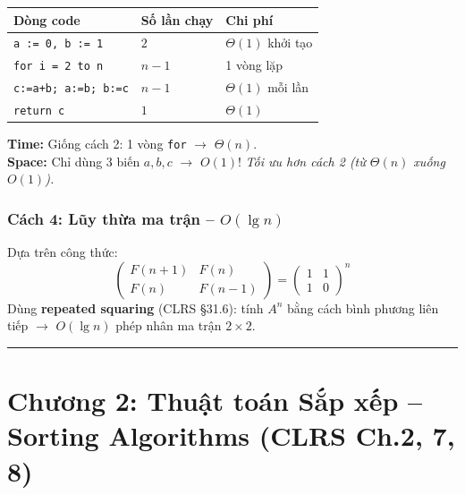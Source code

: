 \documentclass[10pt]{article}
\begin{document}
\begin{tcolorbox}[colback=yellow!5, colframe=orange!50, boxrule=0.5pt, arc=2pt, title={\small\textbf{Phân tích Complexity -- Fibonacci DP tối ưu space}}]
\begin{tabular}{|l|l|l|}
\hline
\textbf{Dòng code} & \textbf{Số lần chạy} & \textbf{Chi phí} \\
\hline
\texttt{a := 0, b := 1} & $2$ & $\Theta(1)$ khởi tạo \\
\hline
\texttt{for i = 2 to n} & $n-1$ & 1 vòng lặp \\
\hline
\quad \texttt{c:=a+b; a:=b; b:=c} & $n-1$ & $\Theta(1)$ mỗi lần \\
\hline
\texttt{return c} & $1$ & $\Theta(1)$ \\
\hline
\end{tabular}
\vspace{0.2cm}

\textbf{Time:} Giống cách 2: 1 vòng \texttt{for} $\to$ $\Theta(n)$.\\
\textbf{Space:} Chỉ dùng 3 biến $a, b, c$ $\to$ $O(1)$! \textit{Tối ưu hơn cách 2 (từ $\Theta(n)$ xuống $O(1)$).}
\end{tcolorbox}

\subsubsection{\texorpdfstring{Cách 4: Lũy thừa ma trận --
\(O(\lg n)\)}{Cách 4: Lũy thừa ma trận -- O(\textbackslash log n)}}\label{cuxe1ch-4-lux169y-thux1eeba-ma-trux1eadn-olog-n}

Dựa trên công thức:
\[\begin{pmatrix} F(n+1) & F(n) \\ F(n) & F(n-1) \end{pmatrix} = \begin{pmatrix} 1 & 1 \\ 1 & 0 \end{pmatrix}^n\]
Dùng \textbf{repeated squaring} (CLRS \S 31.6): tính \(A^n\) bằng cách
bình phương liên tiếp \(\to\) \(O(\lg n)\) phép nhân ma trận
\(2 \times 2\).

\begin{center}\rule{0.5\linewidth}{0.5pt}\end{center}

\section{Chương 2: Thuật toán Sắp xếp -- Sorting Algorithms (CLRS Ch.2, 7, 8)}\label{chux1b0ux1a1ng-2-thuux1eadt-touxe1n-sux1eafp-xux1ebfp-clrs-ch.2-7-8}
\end{document}

